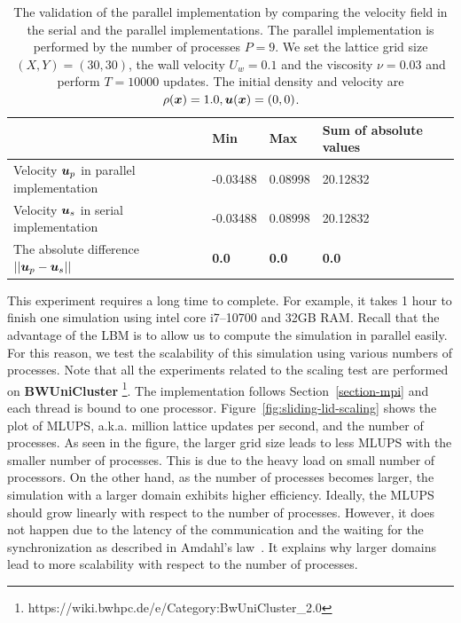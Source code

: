 \begin{table}
  \begin{center}
    \caption{The validation of the parallel implementation by comparing
    the velocity field in the serial and the parallel implementations.
    The parallel implementation is performed by the number of processes $P = 9$.
    We set the lattice grid size $(X, Y) = (30, 30)$,
    the wall velocity $U_w = 0.1$ and the viscosity $\nu = 0.03$
    and perform $T = 10000$ updates.
    The initial density and velocity are $\rho(\boldsymbol{x}) = 1.0, \boldsymbol{u}(\boldsymbol{x}) = (0, 0)$.
    }
    \vspace{2mm}
    \label{tab:parallel-validation}
    \begin{tabular}{llll}
      \toprule
       & Min & Max & Sum of absolute values \\
      \midrule
      Velocity $\boldsymbol{u}_p$ in parallel implementation & -0.03488 & 0.08998 & 20.12832 \\
      Velocity $\boldsymbol{u}_s$ in serial implementation & -0.03488 & 0.08998 & 20.12832 \\
      The absolute difference $|| \boldsymbol{u}_p - \boldsymbol{u}_s ||$ & {\bf 0.0} & {\bf 0.0} & {\bf 0.0} \\
      \bottomrule
    \end{tabular}
  \end{center}
  \vspace{-5mm}
\end{table}

This experiment requires a long time to complete.
For example, it takes 1 hour to finish one simulation using
intel core i7--10700 and 32GB RAM.
Recall that the advantage of the LBM is to allow us to compute the simulation in
parallel easily.
For this reason, we test the scalability of this simulation using
various numbers of processes.
Note that all the experiments related to the scaling test
are performed on {\bf BWUniCluster}
\footnote{https://wiki.bwhpc.de/e/Category:BwUniCluster\_2.0}.
The implementation follows Section~\ref{section-mpi}
and each thread is bound to one processor.
Figure~\ref{fig:sliding-lid-scaling} shows the plot of
MLUPS, a.k.a. million lattice updates per second, and
the number of processes.
As seen in the figure, the larger grid size leads to
less MLUPS with the smaller number of processes.
This is due to the heavy load on small number of processors.
On the other hand, as the number of processes
becomes larger, the simulation with a larger domain exhibits
higher efficiency.
Ideally, the MLUPS should grow linearly with respect to the number of processes.
However, it does not happen due to the latency of the communication
and the waiting for the synchronization as described in Amdahl's law~\cite{amdahl1967validity}.
It explains why larger domains lead to more scalability with respect to
the number of processes.


